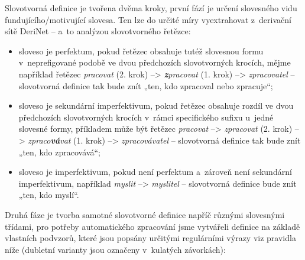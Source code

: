 Slovotvorná definice je tvořena dvěma kroky, první fází je určení
slovesného vidu fundujícího/motivující slovesa. Ten lze do určité míry
vyextrahovat z~derivační sítě DeriNet -- a~to analýzou slovotvorného
řetězce:

\begin{itemize}
\tightlist
\item
  sloveso je perfektum, pokud řetězec obsahuje tutéž slovesnou formu
v~neprefigované podobě ve dvou předchozích slovotvorných krocích, mějme
  například řetězec \emph{pracovat} (2. krok) --\textgreater{}
  \emph{\textbf{z}pracovat} (1. krok) --\textgreater{}
  \emph{zpracovatel} -- slovotvorná definice tak bude znít „ten, kdo
  zpracoval nebo zpracuje``;
\item
  sloveso je sekundární imperfektivum, pokud řetězec obsahuje rozdíl ve
  dvou předchozích slovotvorných krocích v~rámci specifického sufixu
u~jedné slovesné formy, příkladem může být řetězec \emph{pracovat}
  --\textgreater{} \emph{zpracovat} (2. krok) --\textgreater{}
  \emph{zpraco\textbf{vá}vat} (1. krok) --\textgreater{}
  \emph{zpracovávatel} -- slovotvorná definice tak bude znít „ten, kdo
  zpracovává``;
\item
  sloveso je imperfektivum, pokud není perfektum a~zároveň není
  sekundární imperfektivum, například \emph{myslit} --\textgreater{}
  \emph{myslitel} -- slovotvorná definice bude znít „ten, kdo myslí``.
\end{itemize}

Druhá fáze je tvorba samotné slovotvorné definice napříč různými
slovesnými třídami, pro potřeby automatického zpracování jsme vytvářeli
definice na základě vlastních podvzorů, které jsou popsány určitými
regulárními výrazy viz pravidla níže (dubletní varianty jsou označeny
v~kulatých závorkách):

